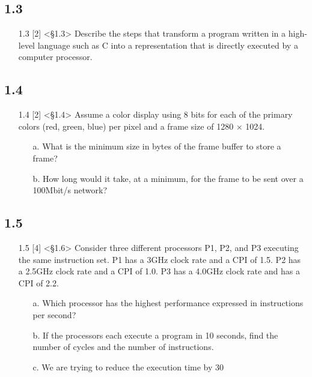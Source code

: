 \documentclass{article}
\begin{document}
\subsection*{1.3}
\begin{enumerate}
    \item[1.3] [2] <§1.3> Describe the steps that transform a program written in a high-level language such as C into a representation that is directly executed by a computer processor.
\end{enumerate}

\subsection*{1.4}
\begin{enumerate}
    \item[1.4] [2] <§1.4> Assume a color display using 8 bits for each of the primary colors (red, green, blue) per pixel and a frame size of 1280 × 1024.
    \begin{enumerate}
        \item[a.] What is the minimum size in bytes of the frame buffer to store a frame?
        \item[b.] How long would it take, at a minimum, for the frame to be sent over a 100Mbit/s network?
    \end{enumerate}
\end{enumerate}

\subsection*{1.5}
\begin{enumerate}
    \item[1.5] [4] <§1.6> Consider three different processors P1, P2, and P3 executing the same instruction set. P1 has a 3GHz clock rate and a CPI of 1.5. P2 has a 2.5GHz clock rate and a CPI of 1.0. P3 has a 4.0GHz clock rate and has a CPI of 2.2.
    \begin{enumerate}
        \item[a.] Which processor has the highest performance expressed in instructions per second?
        \item[b.] If the processors each execute a program in 10 seconds, find the number of cycles and the number of instructions.
        \item[c.] We are trying to reduce the execution time by 30%
    \end{enumerate}
\end{enumerate}
\end{document}

